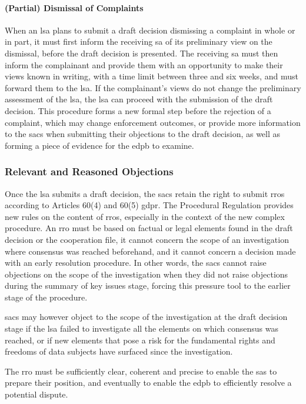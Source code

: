 \paragraph{(Partial) Dismissal of Complaints} 
When an \gls{lsa} plans to submit a draft decision dismissing a complaint in whole or in part, it must first inform the receiving \gls{sa} of its preliminary view on the dismissal, before the draft decision is presented.\autocite[16(1)]{ProceduralRegulation}
The receiving \gls{sa} must then inform the complainant and provide them with an opportunity to make their views known in writing, with a time limit between three and six weeks, and must forward them to the \gls{lsa}.\autocite[16(1)--(2)]{ProceduralRegulation}
If the complainant's views do not change the preliminary assessment of the \gls{lsa}, the \gls{lsa} can proceed with the submission of the draft decision.\autocite[16(3)]{ProceduralRegulation}
This procedure forms a new formal step before the rejection of a complaint, which may change enforcement outcomes, or provide more information to the \glspl{sac} when submitting their objections to the draft decision, as well as forming a piece of evidence for the \gls{edpb} to examine.

\subsubsection{Relevant and Reasoned Objections}
\label{sec:ch3-relevant-reasoned-objections-postreform}

Once the \gls{lsa} submits a draft decision, the \glspl{sac} retain the right to submit \glspl{rro} according to Articles 60(4) and 60(5) \gls{gdpr}.
The Procedural Regulation provides new rules on the content of \glspl{rro}, especially in the context of the new complex procedure.
An \gls{rro} must be based on factual or legal elements found in the draft decision or the cooperation file, it cannot concern the scope of an investigation where consensus was reached beforehand, and it cannot concern a decision made with an early resolution procedure.\autocite[23(1)]{ProceduralRegulation}
In other words, the \glspl{sac} cannot raise objections on the scope of the investigation when they did not raise objections during the summary of key issues stage, forcing this pressure tool to the earlier stage of the procedure.

\glspl{sac} may however object to the scope of the investigation at the draft decision stage if the \gls{lsa} failed to investigate all the elements on which consensus was reached, or if new elements that pose a risk for the fundamental rights and freedoms of data subjects have surfaced since the investigation.\autocite[23(2)]{ProceduralRegulation}

The \gls{rro} must be sufficiently clear, coherent and precise to enable the \glspl{sa} to prepare their position, and eventually to enable the \gls{edpb} to efficiently resolve a potential dispute.\autocite[23(3)]{ProceduralRegulation}